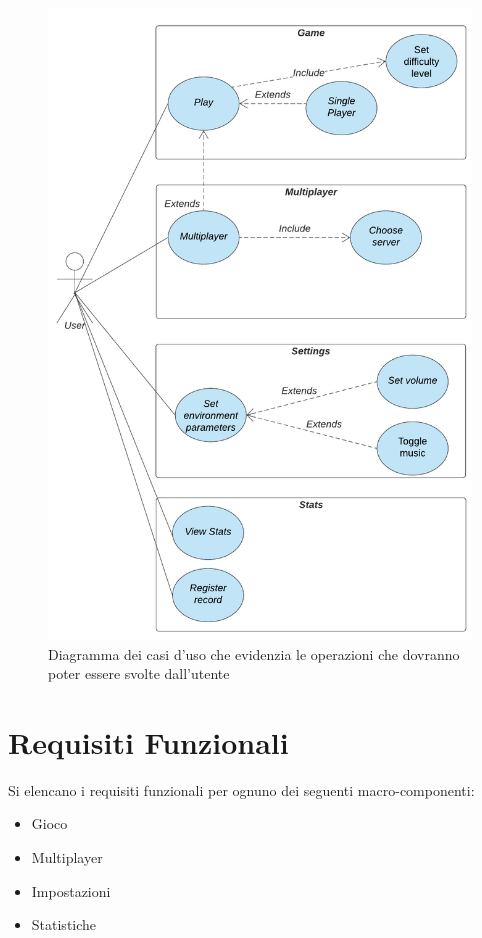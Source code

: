 	\begin{figure}[H]
		\centering
		\includegraphics[width=0.80\columnwidth]{Diagrams/useCaseDiagram}
		\caption{Diagramma dei casi d'uso che evidenzia le operazioni che dovranno poter essere svolte dall'utente}
		\label{fig:figure1}
	\end{figure}

	
	\section{Requisiti Funzionali}
	Si elencano i requisiti funzionali per ognuno dei seguenti macro-componenti:
	\begin{itemize}
	    \item Gioco
	    \item Multiplayer
	    \item Impostazioni
	    \item Statistiche
	\end{itemize}


